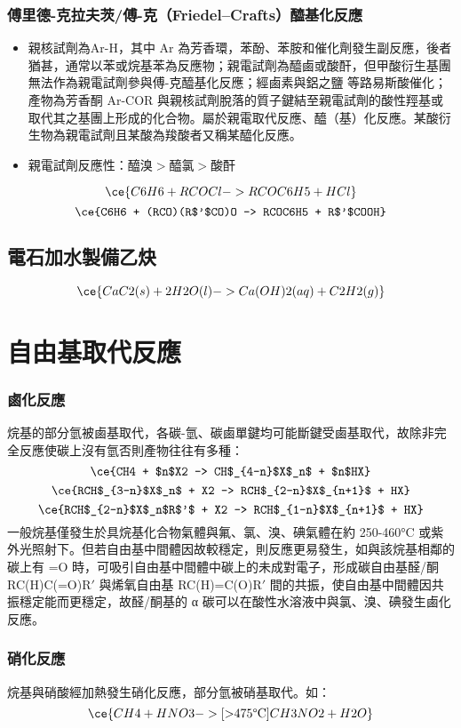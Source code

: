 \documentclass[a4paper,12pt]{report}
\begin{document}
\begin{itemize}
\subsubsection{傅里德-克拉夫茨/傅-克（Friedel–Crafts）醯基化反應}
\begin{itemize}
\item 親核試劑為Ar-H，其中 Ar 為芳香環，苯酚、苯胺和催化劑發生副反應，後者猶甚，通常以苯或烷基苯為反應物；親電試劑為醯鹵或酸酐，但甲酸衍生基團無法作為親電試劑參與傅-克醯基化反應；經鹵素與鋁之鹽  等路易斯酸催化；產物為芳香酮 Ar-COR 與親核試劑脫落的質子鍵結至親電試劑的酸性羥基或取代其之基團上形成的化合物。屬於親電取代反應、醯（基）化反應。某酸衍生物為親電試劑且某酸為羧酸者又稱某醯化反應。
\item 親電試劑反應性：$\text{醯溴} > \text{醯氯} > \text{酸酐}$
\end{itemize}
\[\ce{C6H6 + RCOCl -> RCOC6H5 + HCl}\]
\[\ce{C6H6 + (RCO)(R$'$CO)O -> RCOC6H5 + R$'$COOH}\]
\subsection{電石加水製備乙炔}
\[\ce{CaC2(s) + 2H2O(l) -> Ca(OH)2(aq) + C2H2(g)}\]



\section{自由基取代反應}
\subsubsection{鹵化反應}
烷基的部分氫被鹵基取代，各碳-氫、碳鹵單鍵均可能斷鍵受鹵基取代，故除非完全反應使碳上沒有氫否則產物往往有多種：
\[\ce{CH4 + $n$X2 -> CH$_{4-n}$X$_n$ + $n$HX}\]
\[\ce{RCH$_{3-n}$X$_n$ + X2 -> RCH$_{2-n}$X$_{n+1}$ + HX}\]
\[\ce{RCH$_{2-n}$X$_n$R$'$ + X2 -> RCH$_{1-n}$X$_{n+1}$ + HX}\]
一般烷基僅發生於具烷基化合物氣體與氟、氯、溴、碘氣體在約 250-460°C  或紫外光照射下。但若自由基中間體因故較穩定，則反應更易發生，如與該烷基相鄰的碳上有 =O 時，可吸引自由基中間體中碳上的未成對電子，形成碳自由基醛/酮 RC(H)C(=O)R$'$ 與烯氧自由基 RC(H)=C(O)R$'$ 間的共振，使自由基中間體因共振穩定能而更穩定，故醛/酮基的 α 碳可以在酸性水溶液中與氯、溴、碘發生鹵化反應。
\subsubsection{硝化反應}
烷基與硝酸經加熱發生硝化反應，部分氫被硝基取代。如：
\[\ce{CH4 + HNO3 ->[\text{>475°C}] CH3NO2 + H2O}\]



\end{itemize}
\end{document}
